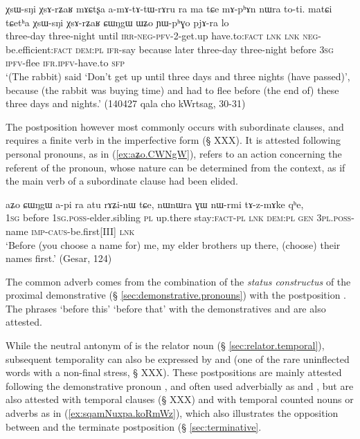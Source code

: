 \begin{exe}
\ex \label{ex:XsArZaR.CWNgW}
 \gll χsɯ-sŋi χsɤ-rʑaʁ mɤɕtʂa a-mɤ-tɤ-tɯ-rɤru ra ma tɕe mɤ-pʰɤn nɯra to-ti. matɕi tɕetʰa χsɯ-sŋi χsɤ-rʑaʁ ɕɯŋgɯ ɯʑo ɲɯ-pʰɣo pjɤ-ra lo \\
 three-day  three-night until \textsc{irr}-\textsc{neg}-\textsc{pfv}-2-get.up have.to:\textsc{fact} \textsc{lnk} \textsc{lnk}  \textsc{neg}-be.efficient:\textsc{fact} \textsc{dem}:\textsc{pl} \textsc{ifr}-say because later   three-day  three-night before \textsc{3sg} \textsc{ipfv}-flee \textsc{ifr}.\textsc{ipfv}-have.to \textsc{sfp} \\
 \glt `(The rabbit) said `Don't get up until three days and three nights (have passed)', because (the rabbit was buying time) and had to flee before (the end of) these three days and nights.' (140427 qala cho kWrtsag, 30-31)
\end{exe}

The postposition    however most commonly occurs with subordinate clauses, and requires a finite verb in the imperfective form (§ XXX). It is attested following personal pronouns, as in (\ref{ex:aʑo.CWNgW}),   refers to an action concerning the referent of the pronoun, whose nature can be determined from the context, as if the main verb of a subordinate clause had been elided.

\begin{exe}
\ex \label{ex:aʑo.CWNgW}
 \gll  aʑo ɕɯŋgɯ a-pi ra atu rɤʑi-nɯ tɕe, nɯnɯra ɣɯ nɯ-rmi tɤ-z-mɤke qʰe, \\
 \textsc{1sg} before \textsc{1sg}.\textsc{poss}-elder.sibling \textsc{pl} up.there stay:\textsc{fact}-\textsc{pl} \textsc{lnk} \textsc{dem}:\textsc{pl} \textsc{gen} \textsc{3pl}.\textsc{poss}-name \textsc{imp}-\textsc{caus}-be.first[III] \textsc{lnk} \\
 \glt `Before (you choose a name for) me, my elder brothers up there, (choose) their names first.' (Gesar, 124)
\end{exe}


The common adverb  comes from the combination of the \textit{status constructus} of the proximal demonstrative  (§ \ref{sec:demonstrative.pronouns}) with the postposition . The phrases  `before this'  `before that' with the demonstratives  and   are also attested.

While the neutral antonym of  is the relator noun  (§ \ref{sec:relator.temporal}), subsequent temporality can also be expressed by  and  (one of the rare uninflected words with a non-final stress, § XXX). These postpositions are mainly attested following the demonstrative pronoun , and often used adverbially as  and , but are also attested with temporal clauses (§ XXX) and with temporal counted nouns or adverbs as in (\ref{ex:sqamNuxpa.koRmWz}), which also illustrates the opposition between  and the terminate postposition  (§ \ref{sec:terminative}. 

